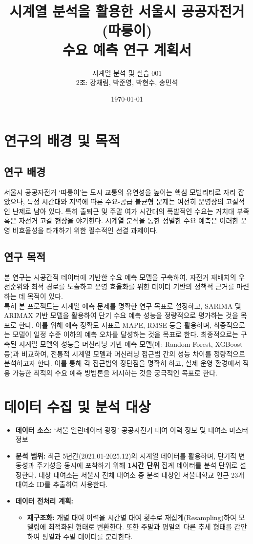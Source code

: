 \documentclass[11pt, a4paper]{article}
\title{\textbf{시계열 분석을 활용한 서울시 공공자전거(따릉이) \\ 수요 예측 연구 계획서}}
\author{시계열 분석 및 실습 001 \\ [1ex] 2조: 강채림, 박준영, 박현수, 송민석}
\date{\today}
\begin{document}
	
	\maketitle
	
	\section{연구의 배경 및 목적}
	\subsection{연구 배경}
	서울시 공공자전거 ‘따릉이’는 도시 교통의 유연성을 높이는 핵심 모빌리티로 자리 잡았으나, 특정 시간대와 지역에 따른 수요-공급 불균형 문제는 여전히 운영상의 고질적인 난제로 남아 있다. 특히 출퇴근 및 주말 여가 시간대의 폭발적인 수요는 거치대 부족 혹은 자전거 고갈 현상을 야기한다. 시계열 분석을 통한 정밀한 수요 예측은 이러한 운영 비효율성을 타개하기 위한 필수적인 선결 과제이다.
	
	\subsection{연구 목적}
	본 연구는 시공간적 데이터에 기반한 수요 예측 모델을 구축하여, 자전거 재배치의 우선순위와 최적 경로를 도출하고 운영 효율화를 위한 데이터 기반의 정책적 근거를 마련하는 데 목적이 있다. \\ 특히 본 프로젝트는 시계열 예측 문제를 명확한 연구 목표로 설정하고, SARIMA 및 ARIMAX 기반 모델을 활용하여 단기 수요 예측 성능을 정량적으로 평가하는 것을 목표로 한다. 이를 위해 예측 정확도 지표로 MAPE, RMSE 등을 활용하며, 최종적으로는 모델이 일정 수준 이하의 예측 오차를 달성하는 것을 목표로 한다. 최종적으로는 구축된 시계열 모델의 성능을 머신러닝 기반 예측 모델(예: Random Forest, XGBoost 등)과 비교하여, 전통적 시계열 모델과 머신러닝 접근법 간의 성능 차이를 정량적으로 분석하고자 한다. 이를 통해 각 접근법의 장단점을 명확히 하고, 실제 운영 환경에서 적용 가능한 최적의 수요 예측 방법론을 제시하는 것을 궁극적인 목표로 한다.
	
	
	\section{데이터 수집 및 분석 대상}
	\begin{itemize}
		\item \textbf{데이터 소스:} ‘서울 열린데이터 광장’ 공공자전거 대여 이력 정보 및 대여소 마스터 정보
		\item \textbf{분석 범위:} 최근 5년간(2021.01-2025.12)의 시계열 데이터를 활용하며, 단기적 변동성과 주기성을 동시에 포착하기 위해 \textbf{1시간 단위} 집계 데이터를 분석 단위로 설정한다. 대상 대여소는 서울시 전체 대여소 중 분석 대상인 서울대학교 인근 23개 대여소 ID를 추출히여 사용한다.
		\item \textbf{데이터 전처리 계획:}
		\begin{itemize}
			\item \textbf{재구조화:} 개별 대여 이력을 시간별 대여 횟수로 재집계(Resampling)하여 모델링에 최적화된 형태로 변환한다. 또한 주말과 평일의 다른 추세 형태를 감안하여 평일과 주말 데이터를 분리한다.
		\end{itemize}
	\end{itemize}
	
\end{document}
